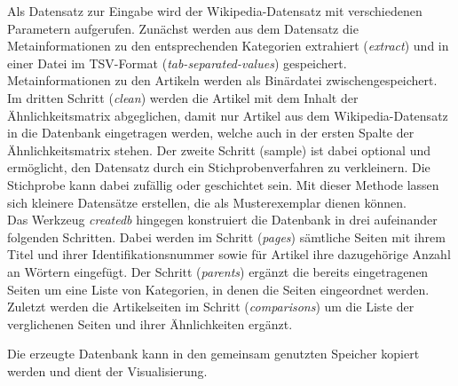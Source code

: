 Als Datensatz zur Eingabe wird der Wikipedia-Datensatz mit verschiedenen Parametern aufgerufen.
Zunächst werden aus dem Datensatz die Metainformationen zu den entsprechenden Kategorien extrahiert (\emph{extract}) und in einer Datei im TSV-Format (\emph{tab-separated-values}) gespeichert.
Metainformationen zu den Artikeln werden als Binärdatei zwischengespeichert. %
Im dritten Schritt (\emph{clean}) werden die Artikel mit dem Inhalt der Ähnlichkeitsmatrix abgeglichen, damit nur Artikel aus dem Wikipedia-Datensatz in die Datenbank eingetragen werden, welche auch in der ersten Spalte der Ähnlichkeitsmatrix stehen.
Der zweite Schritt (sample) ist dabei optional und ermöglicht, den Datensatz durch ein Stichprobenverfahren zu verkleinern.
Die Stichprobe kann dabei zufällig oder geschichtet sein. 
Mit dieser Methode lassen sich kleinere Datensätze erstellen, die als Musterexemplar dienen können.\\
Das Werkzeug \emph{createdb} hingegen konstruiert die Datenbank in drei aufeinander folgenden Schritten.
Dabei werden im Schritt (\emph{pages}) sämtliche Seiten mit ihrem Titel und ihrer Identifikationsnummer sowie für Artikel ihre dazugehörige Anzahl an Wörtern eingefügt.
Der Schritt (\emph{parents}) ergänzt die bereits eingetragenen Seiten um eine Liste von Kategorien, in denen die Seiten eingeordnet werden.
Zuletzt werden die Artikelseiten im Schritt (\emph{comparisons}) um die Liste der verglichenen Seiten und ihrer Ähnlichkeiten ergänzt.

Die erzeugte Datenbank kann in den gemeinsam genutzten Speicher kopiert werden und dient der Visualisierung.


